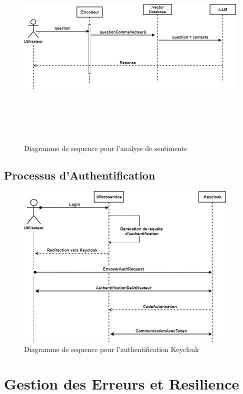 \begin{figure}[H]
\centering
\includegraphics[height=10cm , width=\textwidth]{assets/images/rag-seq.png}
\caption{Diagramme de sequence pour l'analyse de sentiments}
\label{fig:seq-analysis}
\end{figure}

\subsection{Processus d'Authentification}

\begin{figure}[H]
\centering
\includegraphics[height=8cm , width=\textwidth]{assets/images/keycloak-seq.png}
\caption{Diagramme de sequence pour l'authentification Keycloak}
\label{fig:seq-auth}
\end{figure}
\section{Gestion des Erreurs et Resilience}

